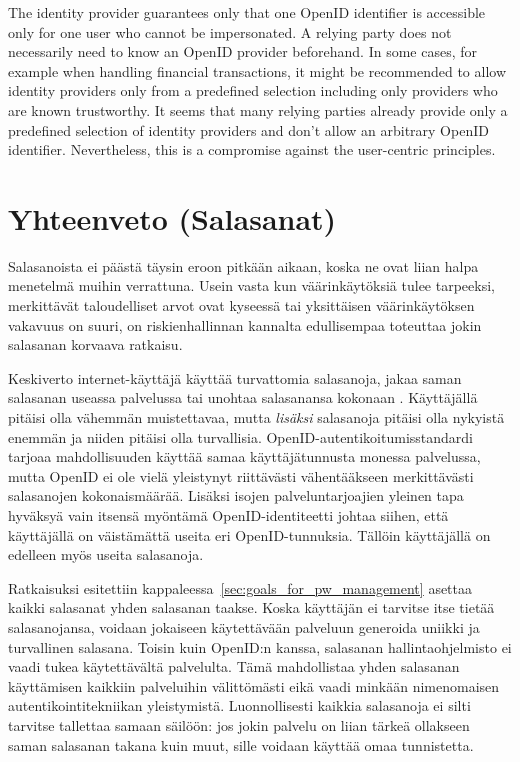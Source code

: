 \documentclass[english,gradu]{tktltiki}
\begin{document}
                 The identity provider guarantees only that one OpenID identifier is accessible only for one user who cannot be impersonated. A relying party does not necessarily need to know an OpenID provider beforehand. In some cases, for example when handling financial transactions, it might be recommended to allow identity providers only from a predefined selection including only providers who are known trustworthy. It seems that many relying parties already provide only a predefined selection of identity providers and don't allow an arbitrary OpenID identifier. Nevertheless, this is a compromise against the user-centric principles.


\section{Yhteenveto (Salasanat)} %
\label{sec:yhteenveto_salasanat_}

Salasanoista ei päästä täysin eroon pitkään aikaan, koska ne ovat liian halpa menetelmä muihin verrattuna. Usein vasta kun väärinkäytöksiä tulee tarpeeksi, merkittävät taloudelliset arvot ovat kyseessä tai yksittäisen väärinkäytöksen vakavuus on suuri, on riskienhallinnan kannalta edullisempaa toteuttaa jokin salasanan korvaava ratkaisu.

Keskiverto internet-käyttäjä käyttää turvattomia salasanoja, jakaa saman salasanan useassa palvelussa tai unohtaa salasanansa kokonaan \cite{study_of_passwords_07, password_management_strategies_06, generating_and_remembering_pws_04, users_are_not_the_enemy_99}. Käyttäjällä pitäisi olla vähemmän muistettavaa, mutta \emph{lisäksi} salasanoja pitäisi olla nykyistä enemmän ja niiden pitäisi olla turvallisia.
OpenID-autentikoitumisstandardi tarjoaa mahdollisuuden käyttää samaa käyttäjätunnusta monessa palvelussa, mutta OpenID ei ole vielä yleistynyt riittävästi vähentääkseen merkittävästi salasanojen kokonaismäärää. Lisäksi isojen palveluntarjoajien yleinen tapa hyväksyä vain itsensä myöntämä OpenID-identiteetti johtaa siihen, että käyttäjällä on väistämättä useita eri OpenID-tunnuksia. Tällöin käyttäjällä on edelleen myös useita salasanoja.

Ratkaisuksi esitettiin kappaleessa~\ref{sec:goals_for_pw_management} asettaa kaikki salasanat yhden salasanan taakse. Koska käyttäjän ei tarvitse itse tietää salasanojansa, voidaan jokaiseen käytettävään palveluun generoida uniikki ja turvallinen salasana. Toisin kuin OpenID:n kanssa, salasanan hallintaohjelmisto ei vaadi tukea käytettävältä palvelulta. Tämä mahdollistaa yhden salasanan käyttämisen kaikkiin palveluihin välittömästi eikä vaadi minkään nimenomaisen autentikointitekniikan yleistymistä. Luonnollisesti kaikkia salasanoja ei silti tarvitse tallettaa samaan säilöön: jos jokin palvelu on liian tärkeä ollakseen saman salasanan takana kuin muut, sille voidaan käyttää omaa tunnistetta.
\end{document}
